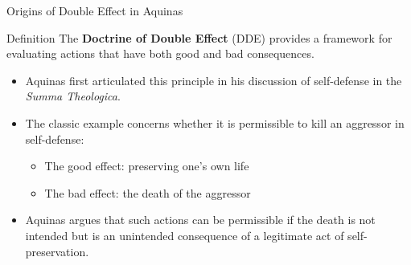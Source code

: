 \documentclass{beamer}
\begin{document}
\begin{frame}{Origins of Double Effect in Aquinas}
    \begin{alertblock}{Definition}
        The \textbf{Doctrine of Double Effect} (DDE) provides a framework for evaluating actions that have both good and bad consequences.
    \end{alertblock}

    \begin{itemize}
        \item Aquinas first articulated this principle in his discussion of self-defense in the \textit{Summa Theologica}.
        
        \item The classic example concerns whether it is permissible to kill an aggressor in self-defense:
        \begin{itemize}
            \item The good effect: preserving one's own life
            \item The bad effect: the death of the aggressor
        \end{itemize}
        
        \item Aquinas argues that such actions can be permissible if the death is not intended but is an unintended consequence of a legitimate act of self-preservation.
    \end{itemize}
\end{frame}
\end{document}
